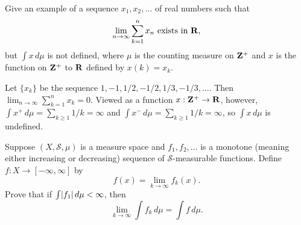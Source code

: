 \documentclass[11pt,oneside]{book}
\begin{document}
\begin{exercise}
    Give an example of a sequence $x_1, x_2, \ldots$ of real numbers such that \[\lim_{n \to \infty} \sum_{k=1}^n x_n \text{ exists in $\mathbf{R}$,}\] but $\int x \, d\mu$ is not defined, where $\mu$ is the counting measure on $\mathbf{Z}^+$ and $x$ is the function on $\mathbf{Z}^+$ to $\mathbf{R}$ defined by $x(k) = x_k$.
\end{exercise}

\begin{solution}
    Let $\{x_k\}$ be the sequence $1, -1, 1/2, -1/2, 1/3, -1/3, \ldots$. Then $\lim_{n \to \infty} \sum_{k=1}^n x_k = 0$. Viewed as a function $x: \mathbf{Z}^+ \to \mathbf{R}$, however, $\int x^+ \, d\mu = \sum_{k \geq 1} 1/k = \infty$ and $\int x^- \, d\mu = \sum_{k \geq 1} 1/k = \infty$, so $\int x \, d\mu$ is undefined.
\end{solution}


\begin{exercise}
    Suppose $(X, \mathscr{S}, \mu)$ is a measure space and $f_1, f_2, \ldots$ is a monotone (meaning either increasing or decreasing) sequence of $\mathscr{S}$-measurable functions. Define $f: X \to [-\infty, \infty]$ by \[f(x) = \lim_{k \to \infty} f_k(x).\] Prove that if $\int \lvert f_1\rvert \, d\mu < \infty$, then \[\lim_{k\to\infty} \int f_k \, d\mu = \int f \, d\mu.\]
\end{exercise}
\end{document}
